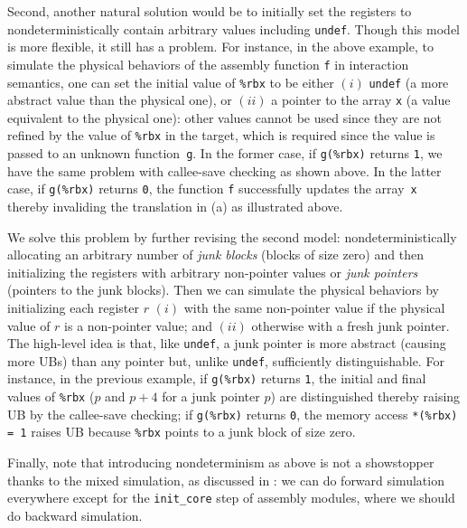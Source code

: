 Second, another natural solution would be to initially set the
\nip{} registers to nondeterministically contain arbitrary
values including \texttt{undef}. Though this model is more flexible,
it still has a problem. For instance, in the above example, to
simulate the physical behaviors of the assembly function \texttt{f} in
interaction semantics, one can set the initial value of \texttt{\%rbx} to
be either $(i)$ \texttt{undef} (\ie a more abstract value than the physical one), or
$(ii)$ a pointer to the array \texttt{x} (\ie a value equivalent to the physical one):
other values cannot be used since they are not refined by the value of \texttt{\%rbx} in the target,
which is required since the value is passed to an unknown function~\texttt{g}.
In the former case, if
\texttt{g(\%rbx)} returns \texttt{1}, we have the same problem with
callee-save checking as shown above.  In the latter case, if
\texttt{g(\%rbx)} returns \texttt{0}, the function \texttt{f}
successfully updates the array~\texttt{x} thereby invaliding the
translation in (a) as illustrated above.

We solve this problem by further revising the second model:
nondeterministically allocating an arbitrary number of \emph{junk
  blocks} (\ie blocks of size zero) and then initializing the
\nip{} registers with arbitrary non-pointer values or
\emph{junk pointers} (\ie pointers to the junk blocks).  Then we can
simulate the physical behaviors by initializing each register $r$
$(i)$ with the same non-pointer value if the physical value of $r$ is
a non-pointer value; and $(ii)$ otherwise with a fresh junk pointer.
The high-level idea is that, like \texttt{undef}, a junk pointer is
more abstract (\ie causing more UBs) than any pointer but, unlike
\texttt{undef}, sufficiently distinguishable. For instance,
in the previous example, if \texttt{g(\%rbx)} returns \texttt{1},
the initial and final values of \texttt{\%rbx} (\ie $p$ and $p+4$ for a junk pointer $p$)
are distinguished thereby raising UB by the callee-save checking;
if \texttt{g(\%rbx)} returns \texttt{0},
the memory access \texttt{*(\%rbx) = 1} raises UB because \texttt{\%rbx}
points to a junk block of size zero.

Finally, note that introducing nondeterminism as above is not a
showstopper thanks to the mixed simulation, as discussed in
: we can do forward
simulation everywhere except for the \texttt{init\_core} step of
assembly modules, where we should do backward simulation.

